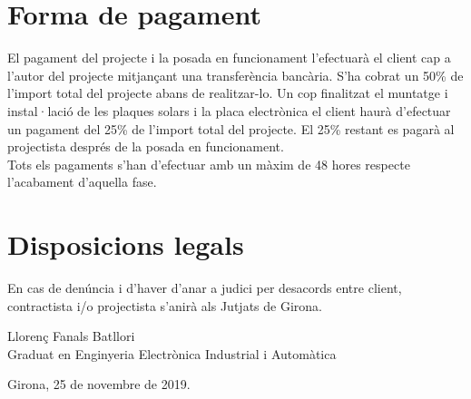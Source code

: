 \section{Forma de pagament}
El pagament del projecte i la posada en funcionament l'efectuarà el client cap a l'autor del projecte mitjançant una transferència bancària. S'ha cobrat un 50\% de l'import total del projecte abans de realitzar-lo. Un cop finalitzat el muntatge i instal·lació de les plaques solars i la placa electrònica el client haurà d'efectuar un pagament del 25\% de l'import total del projecte. El 25\% restant es pagarà al projectista després de la posada en funcionament.\\
\newline Tots els pagaments s'han d'efectuar amb un màxim de 48 hores respecte l'acabament d'aquella fase.

\section{Disposicions legals}
En cas de denúncia i d'haver d'anar a judici per desacords entre client, contractista i/o projectista s'anirà als Jutjats de Girona.



\vspace*{\fill}
\noindent Llorenç Fanals Batllori\\
Graduat en Enginyeria Electrònica Industrial i Automàtica\\
%
\vspace*{16pt}

%
\noindent Girona, 25 de novembre de 2019.

\clearpage